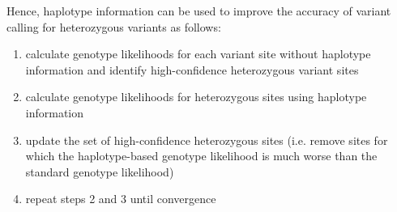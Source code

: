 \documentclass[9pt]{osa-supplemental-document}
\begin{document}
Hence, haplotype information can be used to improve the accuracy of variant calling for heterozygous variants as follows:

\begin{enumerate}
    \item calculate genotype likelihoods for each variant site without haplotype information and identify high-confidence heterozygous variant sites
    \item calculate genotype likelihoods for heterozygous sites using haplotype information 
    \item update the set of high-confidence heterozygous sites (i.e. remove sites for which the haplotype-based genotype likelihood is much worse than the standard genotype likelihood)
    \item repeat  steps 2 and 3 until convergence
\end{enumerate}



















\end{document}
